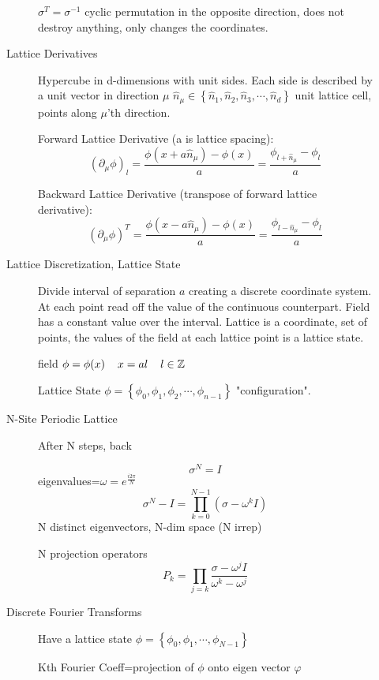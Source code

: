 \begin{description}
\begin{description}
$\sigma^T=\sigma^{-1}$ cyclic permutation in the opposite direction, does not destroy anything, only changes the coordinates.

\item[Lattice Derivatives]

Hypercube in d-dimensions with unit sides. Each side is described by a unit vector in direction $\mu$ $\hat{n}_{\mu}\in\left\lbrace \hat{n}_1,\hat{n}_2,\hat{n}_3,\cdots,\hat{n}_d\right\rbrace$ unit lattice cell, points along $\mu$'th direction.

Forward Lattice Derivative (a is lattice spacing):
$$\left(\partial_{\mu}\phi\right)_l=\frac{\phi(x+a\hat{n}_{\mu})-\phi(x)}{a}=\frac{\phi_{l+\hat{n}_{\mu}}-\phi_l}{a}$$

Backward Lattice Derivative (transpose of forward lattice derivative):
$$\left(\partial_{\mu}\phi\right)^T=\frac{\phi(x-a\hat{n}_{\mu})-\phi(x)}{a}=\frac{\phi_{l-\hat{n}_{\mu}}-\phi_l}{a}$$

\item[Lattice Discretization, Lattice State]

Divide interval of separation $a$ creating a discrete coordinate system. At each point read off the value of the continuous counterpart. Field has a constant value over the interval. Lattice is a coordinate, set of points, the values of the field at each lattice point is a lattice state.

field $\phi=\phi(x)\hspace{4mm}x=al\hspace{4mm}l\in\mathbb{Z}$

Lattice State $\phi=\left\lbrace \phi_0,\phi_1,\phi_2,\cdots,\phi_{n-1}\right\rbrace$ "configuration".

\item[N-Site Periodic Lattice]

After N steps, back

$$\sigma^N=I$$
eigenvalues=$\omega=e^{\frac{i2\pi}{N}}$
$$\sigma^N-I=\prod_{k=0}^{N-1}(\sigma-\omega^kI)$$
N distinct eigenvectors, N-dim space (N irrep)

N projection operators
$$P_k=\prod_{j=k}\frac{\sigma-\omega^jI}{\omega^k-\omega^j}$$

\item[Discrete Fourier Transforms]

Have a lattice state $\phi=\left\lbrace \phi_0,\phi_1,\cdots,\phi_{N-1} \right\rbrace$

Kth Fourier Coeff=projection of $\phi$ onto eigen vector $\varphi$


\end{description}
\end{description}
